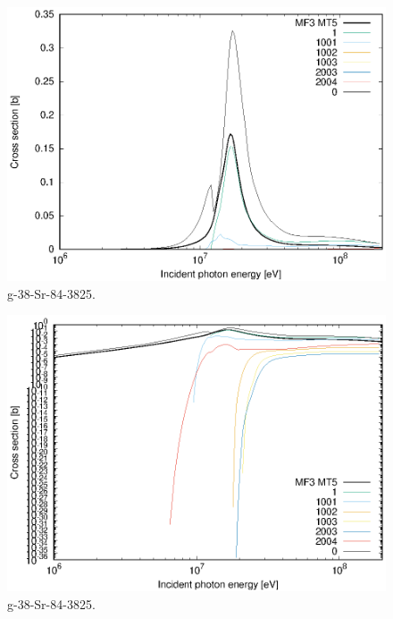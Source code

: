 \begin{figure}
 \includegraphics[width=\linewidth]{eps/g_38-Sr-84_3825.eps}
  \caption{g-38-Sr-84-3825.}
\end{figure}
\begin{figure}
 \includegraphics[width=\linewidth]{eps-log/g_38-Sr-84_3825.eps}
 \caption{g-38-Sr-84-3825.}
\end{figure}
\newpage \clearpage

